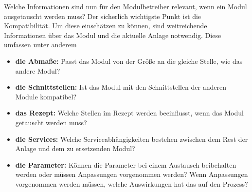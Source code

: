 Welche Informationen sind nun für den Modulbetreiber relevant, wenn ein Modul ausgetauscht werden muss? Der sicherlich wichtigste Punkt ist die Kompatibilität. Um diese einschätzen zu können, sind weitreichende Informationen über das Modul und die aktuelle Anlage notwendig. Diese umfassen unter anderem
\begin{itemize}
\item \textbf{die Abmaße:} Passt das Modul von der Größe an die gleiche Stelle, wie das andere Modul?
\item \textbf{die Schnittstellen:} Ist das Modul mit den Schnittstellen der anderen Module kompatibel?
\item \textbf{das Rezept:} Welche Stellen im Rezept werden beeinflusst, wenn das Modul getauscht werden muss?
\item \textbf{die Services:} Welche Serviceabhängigkeiten bestehen zwischen dem Rest der Anlage und dem zu ersetzenden Modul?
\item \textbf{die Parameter:} Können die Parameter bei einem Austausch beibehalten werden oder müssen Anpassungen vorgenommen werden? Wenn Anpassungen vorgenommen werden müssen, welche Auswirkungen hat das auf den Prozess?
\end{itemize}

